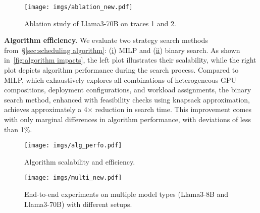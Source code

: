 \begin{figure}[!t]
    \centering
    \texttt{[image: imgs/ablation\_new.pdf]}
    \caption{\small{Ablation study of Llama3-70B on traces 1 and 2.}}
    \label{fig:ablation}
    \vspace{-1em}
\end{figure}

\textbf{Algorithm efficiency.}
We evaluate two strategy search methods from~\S\ref{sec:scheduling algorithm}: (\underline{i}) MILP and (\underline{ii}) binary search. As shown in~\autoref{fig:algorithm impacts}, the left plot illustrates their scalability, while the right plot depicts algorithm performance during the search process.
Compared to MILP, which exhaustively explores all combinations of heterogeneous GPU compositions, deployment configurations, and workload assignments, the binary search method, enhanced with feasibility checks using knapsack approximation, achieves approximately a 4$\times$ reduction in search time. This improvement comes with only marginal differences in algorithm performance, with deviations of less than 1\%.

\begin{figure}[!t]
    \centering
    \texttt{[image: imgs/alg\_perfo.pdf]}
    \caption{\small{Algorithm scalability and efficiency.}}
    \label{fig:algorithm impacts}
    \vspace{-1em}
\end{figure}

\begin{figure}[!t]
    \centering
    \texttt{[image: imgs/multi\_new.pdf]}
    \caption{\small{End-to-end experiments on multiple model types (Llama3-8B and Llama3-70B) with different setups.}}
    \label{fig:multiple models}
    \vspace{-1em}
\end{figure}


